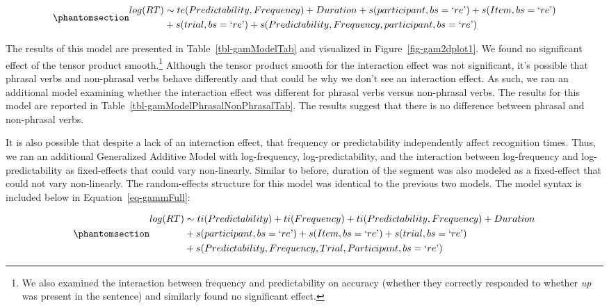 \documentclass[
  12pt,
  letterpaper,
]{scrreprt}
\begin{document}
\begin{equation}\phantomsection\label{eq-gamminteraction}{
\begin{aligned}log(RT) & \sim te(Predictability, Frequency) + Duration + s(participant, bs = \text{`}re\text{'}) + s(Item, bs = \text{`}re\text{'}) \\& + s(trial, bs = \text{`}re\text{'}) + s(Predictability, Frequency, participant, bs = \text{`}re\text{'}) \end{aligned}
}\end{equation}

The results of this model are presented in Table~\ref{tbl-gamModelTab}
and visualized in Figure~\ref{fig-gam2dplot1}. We found no significant
effect of the tensor product smooth.\footnote{We also examined the
  interaction between frequency and predictability on accuracy (whether
  they correctly responded to whether \emph{up} was present in the
  sentence) and similarly found no significant effect.} Although the
tensor product smooth for the interaction effect was not significant,
it's possible that phrasal verbs and non-phrasal verbs behave
differently and that could be why we don't see an interaction effect. As
such, we ran an additional model examining whether the interaction
effect was different for phrasal verbs versus non-phrasal verbs. The
results for this model are reported in
Table~\ref{tbl-gamModelPhrasalNonPhrasalTab}. The results suggest that
there is no difference between phrasal and non-phrasal verbs.

It is also possible that despite a lack of an interaction effect, that
frequency or predictability independently affect recognition times.
Thus, we ran an additional Generalized Additive Model with
log-frequency, log-predictability, and the interaction between
log-frequency and log-predictability as fixed-effects that could vary
non-linearly. Similar to before, duration of the segment was also
modeled as a fixed-effect that could not vary non-linearly. The
random-effects structure for this model was identical to the previous
two models. The model syntax is included below in
Equation~\ref{eq-gammFull}:

\begin{equation}\phantomsection\label{eq-gammFull}{
\begin{aligned}log(RT) & \sim ti(Predictability) + ti(Frequency) + ti(Predictability, Frequency) + Duration \\ & + s(participant, bs = \text{`}re\text{'}) + s(Item, bs = \text{`}re\text{'})  + s(trial, bs = \text{`}re\text{'}) \\ & + s(Predictability, Frequency, Trial, Participant, bs = \text{`}re\text{'}) \end{aligned}
}\end{equation}
\end{document}
